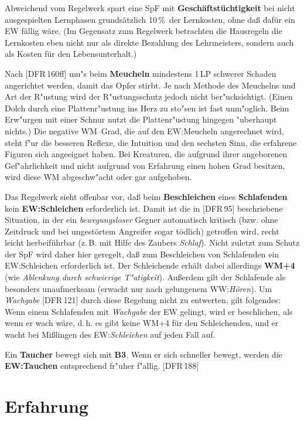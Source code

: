 \documentclass[10pt,a4paper,germanpar]{article}
\begin{document}
Abweichend vom Regelwerk spart eine SpF mit
\textbf{Geschäftstüchtigkeit} bei nicht ausgespielten Lernphasen
grund\-sätz\-lich 10\,\%\ der Lernkosten, ohne daß dafür ein EW fällig
wäre. (Im Gegensatz zum Regelwerk betrachten die Hausregeln die
Lernkosten eben nicht nur als direkte Bezahlung des Lehrmeisters,
sondern auch als Kosten für den Lebensunterhalt.)

Nach [DFR\,160ff] mu"s beim \textbf{Meucheln} mindestens 1\,LP
schwerer Schaden angerichtet werden, damit das Opfer stirbt. Je nach
Methode des Meuchelns und Art der R"ustung wird der R"ustungsschutz
jedoch nicht ber"ucksichtigt. (Einen Dolch durch eine Plattenr"ustung
ins Herz zu sto"sen ist fast unm"oglich. Beim Erw"urgen mit einer
Schnur nutzt die Plattenr"ustung hingegen "uberhaupt nichts.) Die
negative WM--Grad, die auf den EW:Meucheln angerechnet wird, steht
f"ur die besseren Reflexe, die Intuition und den sechsten Sinn, die
erfahrene Figuren sich angeeignet haben. Bei Kreaturen, die aufgrund
ihrer angeborenen Gef"ahrlichkeit und nicht aufgrund von Erfahrung
einen hohen Grad besitzen, wird diese WM abgeschw"acht oder gar
aufgehoben.

Das Regelwerk sieht offenbar vor, daß beim \textbf{Beschleichen} eines
\textbf{Schlafenden} kein \textbf{EW:Schleichen} erforderlich ist.
Damit ist die in [DFR\,95] beschriebene Situation, in der ein
\emph{bewegungsloser} Gegner automatisch kritisch (bzw. ohne Zeitdruck
und bei ungestörtem Angreifer sogar tödlich) getroffen wird, recht
leicht herbeiführbar (z.\,B. mit Hilfe des Zaubers \emph{Schlaf}).
Nicht zuletzt zum Schutz der SpF wird daher hier geregelt, daß zum
Beschleichen von Schlafenden ein EW:Schleichen erforderlich ist. Der
Schleichende erhält dabei allerdings \textbf{WM+4} (wie
\emph{Ablenkung durch schwierige T"atigkeit}). Außerdem gilt der
Schlafende als besonders unaufmerksam (erwacht nur nach gelungenem
WW:\emph{Hören}). Um \emph{Wachgabe} [DFR\,121] durch diese Regelung
nicht zu entwerten, gilt folgendes: Wenn einem Schlafenden mit
\emph{Wachgabe} der EW gelingt, wird er beschlichen, als wenn er wach
wäre, d.\,h. es gibt keine WM+4 für den Schleichenden, und er wacht
bei Mißlingen des EW:\emph{Schleichen} auf jeden Fall auf.

Ein \textbf{Taucher} bewegt sich mit \textbf{B3}. Wenn er sich
schneller bewegt, werden die \textbf{EW:Tauchen} entsprechend fr"uher
f"allig. [DFR\,188]

\section{Erfahrung}
\end{document}
